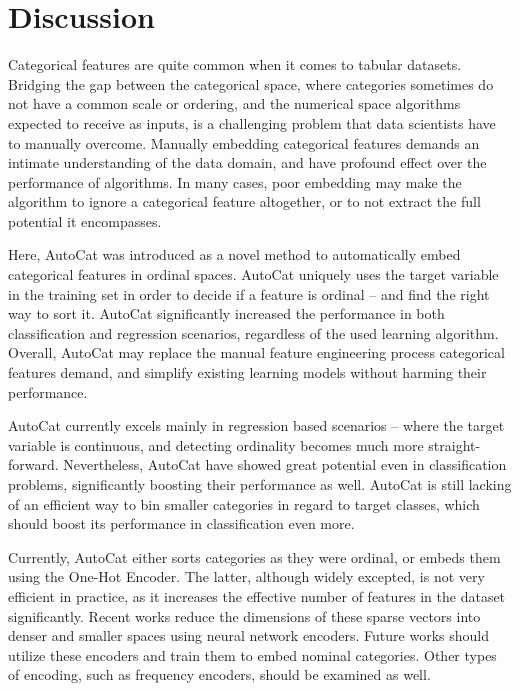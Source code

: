 \documentclass{article}
\begin{document}
\section{Discussion}
Categorical features are quite common when it comes to tabular datasets. Bridging the gap between the categorical space, where categories sometimes do not have a common scale or ordering, and the numerical space algorithms expected to receive as inputs, is a challenging problem that data scientists have to manually overcome. Manually embedding categorical features demands an intimate understanding of the data domain, and have profound effect over the performance of algorithms. In many cases, poor embedding may make the algorithm to ignore a categorical feature altogether, or to not extract the full potential it encompasses.

Here, AutoCat was introduced as a novel method to automatically embed categorical features in ordinal spaces. AutoCat uniquely uses the target variable in the training set in order to decide if a feature is ordinal -- and find the right way to sort it. AutoCat significantly increased the performance in both classification and regression scenarios, regardless of the used learning algorithm. Overall, AutoCat may replace the manual feature engineering process categorical features demand, and simplify existing learning models without harming their performance.

AutoCat currently excels mainly in regression based scenarios -- where the target variable is continuous, and detecting ordinality becomes much more straight-forward. Nevertheless, AutoCat have showed great potential even in classification problems, significantly boosting their performance as well. AutoCat is still lacking of an efficient way to bin smaller categories in regard to target classes, which should boost its performance in classification even more.

Currently, AutoCat either sorts categories as they were ordinal, or embeds them using the One-Hot Encoder. The latter, although widely excepted, is not very efficient in practice, as it increases the effective number of features in the dataset significantly. Recent works reduce the dimensions of these sparse vectors into denser and smaller spaces using neural network encoders. Future works should utilize these encoders and train them to embed nominal categories. Other types of encoding, such as frequency encoders, should be examined as well.





\end{document}
